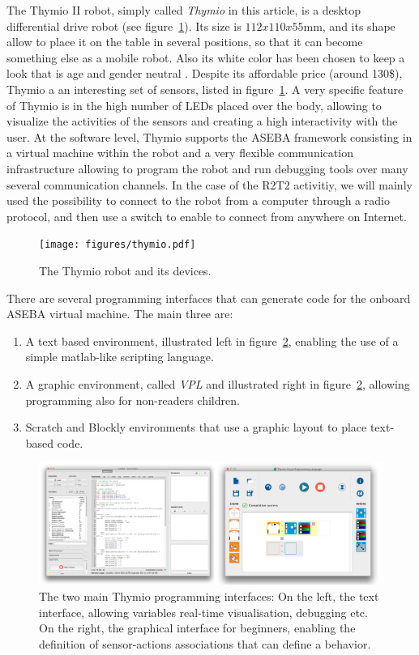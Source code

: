 \documentclass{intech-journal}
\begin{document}
The Thymio II robot, simply called \textit{Thymio} in this article, is a desktop differential drive robot (see figure~\ref{fig:thymio}).
Its size is $112 x 110 x 55$mm, and its shape allow to place it on the table in several positions, so that it can become something else as a mobile robot.
Also its white color has been chosen to keep a look that is age and gender neutral \cite{riedo2013thymio}.
Despite its affordable price (around 130\$), Thymio a an interesting set of sensors, listed in figure~\ref{fig:thymio}.
A very specific feature of Thymio is in the high number of LEDs placed over the body, allowing to visualize the activities of the sensors and creating a high interactivity with the user.
At the software level, Thymio supports the ASEBA framework\cite{magnenat2010aseba} consisting in a virtual machine within the robot and a very flexible communication infrastructure allowing to program the robot and run debugging tools over many several communication channels. 
In the case of the R2T2 activitiy, we will mainly used the possibility to connect to the robot from a computer through a radio protocol, and then use a switch to enable to connect from anywhere on Internet.

\begin{figure}[ht]
 \centering
    \texttt{[image: figures/thymio.pdf]}
  \caption{The Thymio robot and its devices.}
  \label{fig:thymio} 
\end{figure}

There are several programming interfaces that can generate code for the onboard ASEBA virtual machine. 
The main three are:
\begin{enumerate}
\item A text based environment, illustrated left in figure~\ref{fig:programming}, enabling the use of a simple matlab-like scripting language.
\item A graphic environment, called \textit{VPL} and illustrated right in figure~\ref{fig:programming}, allowing programming also for non-readers children.
\item Scratch and Blockly environments that use a graphic layout to place text-based code.
\end{enumerate}

\begin{figure}[ht]
 \centering
    \includegraphics[width=0.9\columnwidth]{figures/studio-VPL.png}
  \caption{The two main Thymio programming interfaces: On the left, the text interface, allowing variables real-time visualisation, debugging etc. On the right, the graphical interface for beginners, enabling the definition of sensor-actions associations that can define a behavior.}
  \label{fig:programming} 
\end{figure}
\end{document}
